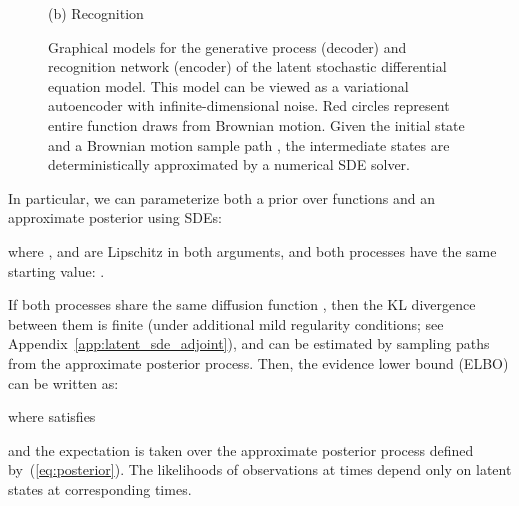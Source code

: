 \documentclass[twoside]{article}
\begin{document}
\begin{figure*}[ht]
\begin{minipage}[t]{0.46\textwidth}
{
	}
	
	(b) Recognition
\end{minipage}


\caption{
  Graphical models for the generative process (decoder) and recognition network (encoder) of the latent stochastic differential equation model.
  This model can be viewed as a variational autoencoder with infinite-dimensional noise.
  Red circles represent entire function draws from Brownian motion. 
  Given the initial state  and a Brownian motion sample path , the intermediate states 
  are deterministically approximated by a numerical SDE solver.
} \label{fig:latent_sde}
\end{figure*}
 
In particular, we can parameterize both a prior over functions and an approximate posterior using SDEs:

where , and 
are Lipschitz in both arguments, and both processes have the same starting value: .

If both processes share the same diffusion function , then the KL divergence between them is finite (under additional mild regularity conditions; see Appendix~\ref{app:latent_sde_adjoint}), and can be estimated by sampling paths from the approximate posterior process.
Then, the evidence lower bound (ELBO) can be written as:

where  satisfies

and the expectation is taken over the approximate posterior process defined by~(\ref{eq:posterior}).
The likelihoods of observations  at times  depend only on latent states  at corresponding times.
\end{document}
